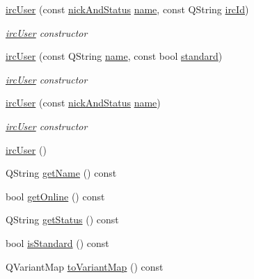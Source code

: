 \begin{DoxyCompactItemize}
\item 
\hyperlink{classserver_1_1irc_user_aad16e165281140577c40f14c8e095373}{irc\-User} (const \hyperlink{structserver_1_1nick_and_status}{nick\-And\-Status} \hyperlink{classserver_1_1irc_user_a741feff79ca2d07554a7fbf879efff63}{name}, const Q\-String \hyperlink{classserver_1_1irc_user_a0380d5ace6770dbdc30187d348d837ed}{irc\-Id})
\begin{DoxyCompactList}\small\item\em \hyperlink{classserver_1_1irc_user}{irc\-User} constructor \end{DoxyCompactList}\item 
\hyperlink{classserver_1_1irc_user_a2bde2b43662ec23784f9f98a7d671e25}{irc\-User} (const Q\-String \hyperlink{classserver_1_1irc_user_a741feff79ca2d07554a7fbf879efff63}{name}, const bool \hyperlink{classserver_1_1irc_user_ac91172ae6a09106ed851634d1e7c6553}{standard})
\begin{DoxyCompactList}\small\item\em \hyperlink{classserver_1_1irc_user}{irc\-User} constructor \end{DoxyCompactList}\item 
\hyperlink{classserver_1_1irc_user_a003aa5c9d137c132fa524a2caab9aed0}{irc\-User} (const \hyperlink{structserver_1_1nick_and_status}{nick\-And\-Status} \hyperlink{classserver_1_1irc_user_a741feff79ca2d07554a7fbf879efff63}{name})
\begin{DoxyCompactList}\small\item\em \hyperlink{classserver_1_1irc_user}{irc\-User} constructor \end{DoxyCompactList}\item 
\hyperlink{classserver_1_1irc_user_a7ed017d168ff4218d4076978a355ffaa}{irc\-User} ()
\item 
Q\-String \hyperlink{classserver_1_1irc_user_a9b5683eaeb89557d6e1b1e57708aeb35}{get\-Name} () const 
\item 
bool \hyperlink{classserver_1_1irc_user_ae25138b12f396f27caf0765ee1dd34db}{get\-Online} () const 
\item 
Q\-String \hyperlink{classserver_1_1irc_user_ac9c8f677bab0526311a94d16ad13fd61}{get\-Status} () const 
\item 
bool \hyperlink{classserver_1_1irc_user_a83a421f05e507496a7cab349cd993b69}{is\-Standard} () const 
\item 
Q\-Variant\-Map \hyperlink{classserver_1_1irc_user_af6bce76d6e000cf6c5ebfb4ce323f442}{to\-Variant\-Map} () const 

\end{DoxyCompactItemize}
